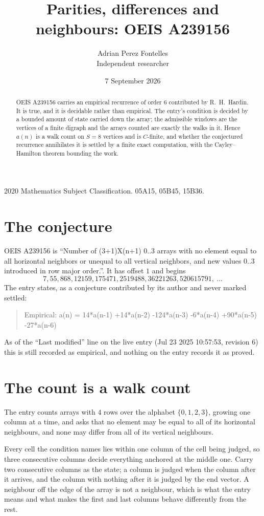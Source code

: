 \documentclass[11pt,a4paper]{article}
\title{Parities, differences and neighbours: OEIS A239156}
\author{Adrian Perez Fontelles\\ \small Independent researcher}
\date{7 September 2026}
\theoremstyle{plain}
\theoremstyle{definition}
\begin{document}
\maketitle

\begin{abstract}
OEIS A239156 carries an empirical recurrence of order $6$ contributed by R.~H.~Hardin. It is
true, and it is decidable rather than empirical. The entry's condition is decided by a bounded amount of state carried down the array; the
admissible windows are the vertices of a finite digraph and the arrays counted are exactly the
walks in it. Hence $a(n)$ is a walk count on $S=8$ vertices and is $C$-finite, and whether the
conjectured recurrence annihilates it is settled by a finite exact computation, with the
Cayley--Hamilton theorem bounding the work.
\end{abstract}

\noindent\small 2020 Mathematics Subject Classification. 05A15, 05B45, 15B36.\normalsize

\section{The conjecture}

OEIS A239156 is ``Number of (3+1)X(n+1) 0..3 arrays with no element equal to all horizontal neighbors or unequal to all vertical neighbors, and new values 0..3 introduced in row major order.''. It has offset $1$ and begins
\[
7, 55, 868, 12159, 175471, 2519488, 36221263, 520615791,\ \dots
\]
The entry states, as a conjecture contributed by its author and never marked settled:
\begin{quote}
Empirical: a(n) = 14*a(n-1) +14*a(n-2) -124*a(n-3) -6*a(n-4) +90*a(n-5) -27*a(n-6)
\end{quote}
As of the ``Last modified'' line on the live entry (Jul 23 2025 10:57:53, revision 6) this is still
recorded as empirical, and nothing on the entry records it as proved.

\section{The count is a walk count}

The entry counts arrays with $4$ rows over the alphabet $\{0,1,2,3\}$, growing one column at a time, and asks that no element may be equal to all of its horizontal neighbours, and none may differ from all of its vertical neighbours.

Every cell the condition names lies within one column of the cell being judged, so three consecutive columns decide everything anchored at the middle one. Carry two consecutive columns as the state; a column is judged when the column after it arrives, and the column with nothing after it is judged by the end vector. A neighbour off the edge of the array is not a neighbour, which is what the entry means and what makes the first and last columns behave differently from the rest.
\end{document}
